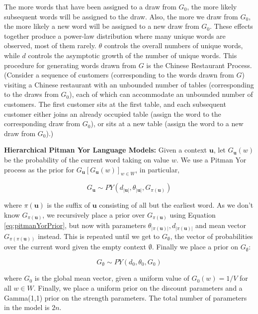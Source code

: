 The more words that have been assigned to a draw from $G_{0}$, the more likely subsequent words will be assigned to the draw. Also, the more we draw from $G_{0}$, the more likely a new word will be assigned to a new draw from $G_{0}$. These effects together produce a power-law distribution where many unique words are observed, most of them rarely. $\theta$ controls the overall numbers of unique words, while $d$ controls the asymptotic growth of the number of unique words. This procedure for generating words drawn from $G$ is the Chinese Restaurant Process. (Consider a sequence of customers (corresponding to the words drawn from $G$) visiting a Chinese restaurant with an unbounded number of tables (corresponding to the draws from $G_{0}$), each of which can accommodate an unbounded number of customers. The first customer sits at the first table, and each subsequent customer either joins an already occupied table (assign the word to the corresponding draw from $G_{0}$), or sits at a new table (assign the word to a new draw from $G_{0}$).)

\textbf{Hierarchical Pitman Yor Language Models:} Given a context $\textbf{u}$, let $G_{\textbf{u}}(w)$ be the probability of the current word taking on value $w$. We use a Pitman Yor process as the prior for $G_{\textbf{u}}[G_{\textbf{u}}(w)]_{w \in W}$, in particular,

\begin{equation}
G_{\textbf{u}}\sim PY(d_{|\textbf{u}|}, \theta_{|\textbf{u}|}, G_{\pi(\textbf{u})})
\label{eq:pitmanYorPrior}
\end{equation}

\noindent where $\pi(\textbf{u})$ is the suffix of $\textbf{u}$ consisting of all but the earliest word. As we don't know $G_{\pi(\textbf{u})}$, we recursively place a prior over $G_{\pi(\textbf{u})}$ using Equation \ref{eq:pitmanYorPrior}, but now with parameters $\theta_{|\pi(\textbf{u})|}, d_{|\pi(\textbf{u})|}$ and mean vector $G_{\pi(\pi(\textbf{u}))}$ instead. This is repeated until we get to $G_{\emptyset}$, the vector of probabilities over the current word given the empty context $\emptyset$. Finally we place a prior on $G_{\emptyset}$:

\begin{equation}
G_{\emptyset} \sim PY(d_{0}, \theta_{0}, G_{0})
\label{eq:emptyContextPrior}
\end{equation}

\noindent where $G_{0}$ is the global mean vector, given a uniform value of $G_{0}(w)=1/V$ for all $w \in W$. Finally, we place a uniform prior on the discount parameters and a Gamma(1,1) prior on the strength parameters. The total number of parameters in the model is $2n$.

